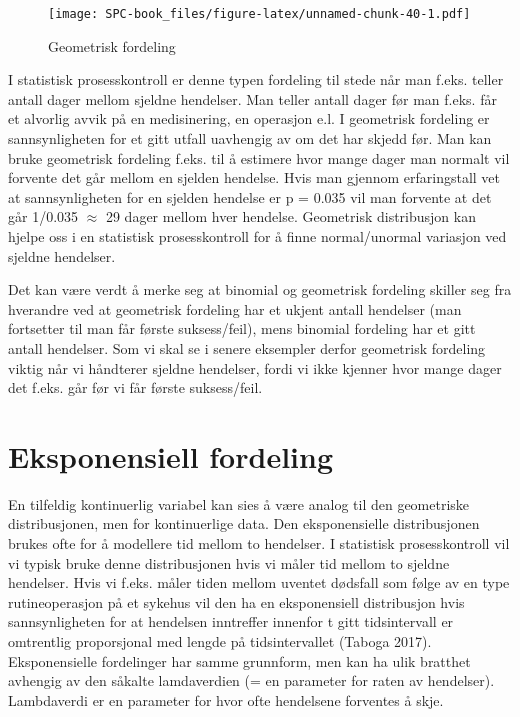 \documentclass[
]{book}
\begin{document}
\begin{figure}
\centering
\texttt{[image: SPC-book\_files/figure-latex/unnamed-chunk-40-1.pdf]}
\caption{\label{fig:unnamed-chunk-40}Geometrisk fordeling}
\end{figure}

I statistisk prosesskontroll er denne typen fordeling til stede når man f.eks. teller antall dager mellom sjeldne hendelser. Man teller antall dager før man f.eks. får et alvorlig avvik på en medisinering, en operasjon e.l. I geometrisk fordeling er sannsynligheten for et gitt utfall uavhengig av om det har skjedd før. Man kan bruke geometrisk fordeling f.eks. til å estimere hvor mange dager man normalt vil forvente det går mellom en sjelden hendelse. Hvis man gjennom erfaringstall vet at sannsynligheten for en sjelden hendelse er p = 0.035 vil man forvente at det går 1/0.035 \(\approx\) 29 dager mellom hver hendelse. Geometrisk distribusjon kan hjelpe oss i en statistisk prosesskontroll for å finne normal/unormal variasjon ved sjeldne hendelser.

Det kan være verdt å merke seg at binomial og geometrisk fordeling skiller seg fra hverandre ved at geometrisk fordeling har et ukjent antall hendelser (man fortsetter til man får første suksess/feil), mens binomial fordeling har et gitt antall hendelser. Som vi skal se i senere eksempler derfor geometrisk fordeling viktig når vi håndterer sjeldne hendelser, fordi vi ikke kjenner hvor mange dager det f.eks. går før vi får første suksess/feil.

\hypertarget{eksponensiell-fordeling}{%
\section{Eksponensiell fordeling}\label{eksponensiell-fordeling}}

En tilfeldig kontinuerlig variabel kan sies å være analog til den geometriske distribusjonen, men for kontinuerlige data. Den eksponensielle distribusjonen brukes ofte for å modellere tid mellom to hendelser. I statistisk prosesskontroll vil vi typisk bruke denne distribusjonen hvis vi måler tid mellom to sjeldne hendelser. Hvis vi f.eks. måler tiden mellom uventet dødsfall som følge av en type rutineoperasjon på et sykehus vil den ha en eksponensiell distribusjon hvis sannsynligheten for at hendelsen inntreffer innenfor t gitt tidsintervall er omtrentlig proporsjonal med lengde på tidsintervallet (Taboga 2017). Eksponensielle fordelinger har samme grunnform, men kan ha ulik bratthet avhengig av den såkalte lamdaverdien (= en parameter for raten av hendelser). Lambdaverdi er en parameter for hvor ofte hendelsene forventes å skje.
\end{document}
